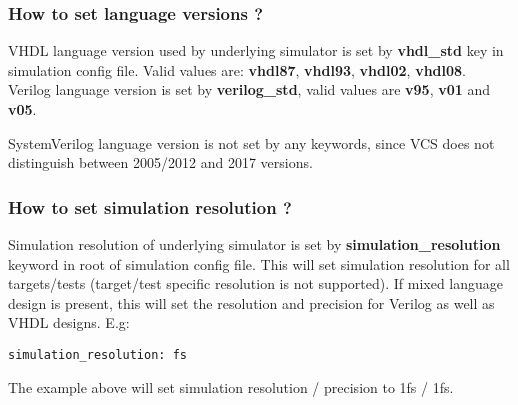 \documentclass{tropic_design_spec}
\begin{document}


\subsubsection{How to set language versions ?}
\label{sec:how-to-set-language-versions}

VHDL language version used by underlying simulator is set by \textbf{vhdl_std} key
in simulation config file. Valid values are: \textbf{vhdl87}, \textbf{vhdl93},
\textbf{vhdl02}, \textbf{vhdl08}. Verilog language version is set by \textbf{verilog_std},
valid values are \textbf{v95}, \textbf{v01} and \textbf{v05}.

SystemVerilog language version is not set by any keywords, since VCS does not distinguish
between 2005/2012 and 2017 versions.


\subsubsection{How to set simulation resolution ?}
\label{sec:how-to-set-simulation-resolution}

Simulation resolution of underlying simulator is set by \textbf{simulation_resolution}
keyword in root of simulation config file. This will set simulation resolution for all
targets/tests (target/test specific resolution is not supported). If mixed language
design is present, this will set the resolution and precision for Verilog as well as
VHDL designs. E.g:

\begin{lstlisting}
simulation_resolution: fs
\end{lstlisting}

The example above will set simulation resolution / precision to 1fs / 1fs.

\end{document}
